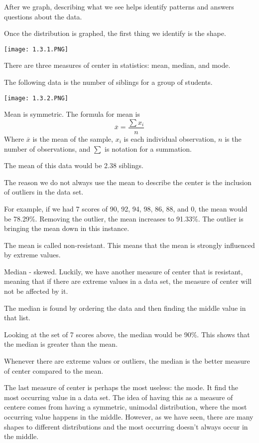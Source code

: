 \documentclass[../stats.tex]{subfiles}
\begin{document}
After we graph, describing what we see helps identify patterns and answers questions about the data.

Once the distribution is graphed, the first thing we identify is the shape.
\begin{center}
    \texttt{[image: 1.3.1.PNG]}
\end{center}

There are three measures of center in statistics: mean, median, and mode.

The following data is the number of siblings for a group of students.
\begin{center}
    \texttt{[image: 1.3.2.PNG]}
\end{center}

Mean is symmetric. The formula for mean is 
\[ \overline{x}=\frac{\sum x_i}{n} \]
Where $\overline{x}$ is the mean of the sample, $x_i$ is each individual observation, $n$ is the number of observations, and $\sum$ is notation for a summation.

The mean of this data would be 2.38 siblings.

The reason we do not always use the mean to describe the center is the inclusion of outliers in the data set.

For example, if we had 7 scores of 90, 92, 94, 98, 86, 88, and 0, the mean would be 78.29\%. Removing the outlier, the mean increases to 91.33\%. The outlier is bringing the mean down in this instance.

The mean is called non-resistant. This means that the mean is strongly influenced by extreme values.

Median - skewed. Luckily, we have another measure of center that is resistant, meaning that if there are extreme values in a data set, the measure of center will not be affected by it.

The median is found by ordering the data and then finding the middle value in that list.

Looking at the set of 7 scores above, the median would be 90\%. This shows that the median is greater than the mean.

Whenever there are extreme values or outliers, the median is the better measure of center compared to the mean.

The last measure of center is perhaps the most useless: the mode. It find the most occurring value in a data set. The idea of having this as a measure of centere comes from having a symmetric, unimodal distribution, where the most occurring value happens in the middle. However, as we have seen, there are many shapes to different distributions and the most occurring doesn't always occur in the middle.
\end{document}
